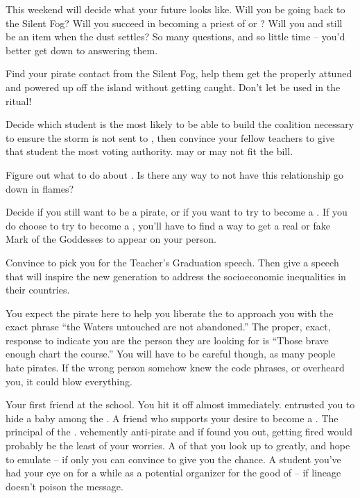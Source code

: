 \documentclass[char]{GL2020}
\begin{document}
This weekend will decide what your future looks like. Will you be going back to the Silent Fog? Will you succeed in becoming a priest of \cEbb{} or \cFlow{}? Will you and \cPrince{} still be an item when the dust settles? So many questions, and so little time  -- you'd better get down to answering them.

\begin{itemz}[Goals]
	\item Find your pirate contact from the Silent Fog, help them get the properly attuned and powered up \iNet{} off the island without getting caught. Don't let \iNet{} be used in the ritual!
	\item Decide which \pShip{} student is the most likely to be able to build the coalition necessary to ensure the storm is not sent to \pShip{}, then convince your fellow teachers to give that student the most voting authority. \cWarlordDaughter{} may or may not fit the bill.
	\item Figure out what to do about \cPrince{}. Is there any way to not have this relationship go down in flames?
	\item Decide if you still want to be a pirate, or if you want to try to become a \cPirate{\cleric}. If you do choose to try to become a \cPirate{\cleric}, you'll have to find a way to get a real or fake Mark of the Goddesses to appear on your person.
	\item Convince \cMusic{} to pick you for the Teacher's Graduation speech. Then give a speech that will inspire the new generation to address the socioeconomic inequalities in their countries.
\end{itemz}

\begin{itemz}[Notes]
	\item You expect the pirate here to help you liberate the \iNet{} to approach you with the exact phrase ``the Waters untouched are not abandoned.'' The proper, exact, response to indicate you are the person they are looking for is ``Those brave enough chart the course.'' You will have to be careful though, as many people hate pirates. If the wrong person somehow knew the code phrases, or overheard you, it could blow everything.
\end{itemz}

\begin{contacts}
	\contact{\cEthics{}} Your first friend at the school. You hit it off almost immediately. \cEthics{\They} entrusted you to hide a baby \cPirateChild{\child} among the \pShippies{}.
	\contact{\cBunker{}} A friend who supports your desire to become a \cPirate{\cleric}.
	\contact{\cPrincipal{}} The principal of the \pSchool{}. \cPrincipal{\They} \cPrincipal{\are} vehemently anti-pirate and if \cPirate{\they} found you out, getting fired would probably be the least of your worries.
	\contact{\cFlowPriest{}} A \cFlowPriest{\clergy} of \cFlow{} that you look up to greatly, and hope to emulate -- if only you can convince \cFlowPriest{\them} to give you the chance.
\contact{\cWarlordDaughter{}} A student you've had your eye on for a while as a potential organizer for the good of \pShip{} -- if \cWarlordDaughter{\their} lineage doesn't poison the message. 
\end{contacts}
\end{document}
